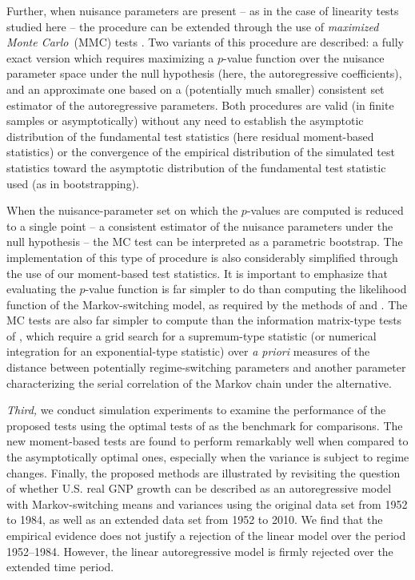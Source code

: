 \documentclass[11pt]{article}
\begin{document}
Further, when nuisance parameters are present -- as in the case of linearity
tests studied here -- the procedure can be extended through the use of \emph{%
maximized Monte Carlo}{\ (MMC) tests \citep{Dufour:2006}. Two variants of
this procedure are described: a fully exact version which requires
maximizing a $p$-value function over the nuisance parameter space under the
null hypothesis (here, the autoregressive coefficients), and an approximate
one based on a (potentially much smaller) consistent set estimator of the
autoregressive parameters. Both procedures are valid (in finite samples or
asymptotically) without any need to establish the asymptotic distribution of
the fundamental test statistics (here residual moment-based statistics) or
the convergence of the empirical distribution of the simulated test
statistics toward the asymptotic distribution of the fundamental test
statistic used (as in bootstrapping). }

When the nuisance-parameter set on which the $p$-values are computed is
reduced to a single point -- a consistent estimator of the nuisance
parameters under the null hypothesis -- the MC test can be interpreted as a
parametric bootstrap. The implementation of this type of procedure is also
considerably simplified through the use of our moment-based test statistics.
It is important to emphasize that evaluating the $p$-value function is far
simpler to do than computing the likelihood function of the Markov-switching
model, as required by the methods of \citet{Hansen:1992, Hansen:1996} and %
\citet{Garcia:1998}. The MC tests are also far simpler to compute than the
information matrix-type tests of \citet{Carrasco-Hu-Ploberger:2014}, which
require a grid search for a supremum-type statistic (or numerical
integration for an exponential-type statistic) over \emph{a priori} measures
of the distance between potentially regime-switching parameters and another
parameter characterizing the serial correlation of the Markov chain under
the alternative.

\emph{Third,} we conduct simulation experiments to examine the performance
of the proposed tests using the optimal tests of %
\citet{Carrasco-Hu-Ploberger:2014} as the benchmark for comparisons. The new
moment-based tests are found to perform remarkably well when compared to the
asymptotically optimal ones, especially when the variance is subject to
regime changes. Finally, the proposed methods are illustrated by revisiting
the question of whether U.S. real GNP growth can be described as an
autoregressive model with Markov-switching means and variances using the
original \citet{Hamilton:1989} data set from 1952 to 1984, as well as an
extended data set from 1952 to 2010. We find that the empirical evidence
does not justify a rejection of the linear model over the period 1952--1984.
However, the linear autoregressive model is firmly rejected over the
extended time period.
\end{document}
